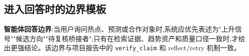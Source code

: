 \subsection{进入回答时的边界模板}

\begin{plainbox}
\textbf{智能体回答边界}:当用户询问热点、预测或合作对象时,系统应优先表述为"上升信号""候选方向""待复核桥接者";只有在检索证据、趋势资产和质量口径一致时,才给出更强结论。该边界与项目报告中的 \texttt{verify\_claim} 和 reflect/retry 机制一致。
\end{plainbox}

\clearpage
